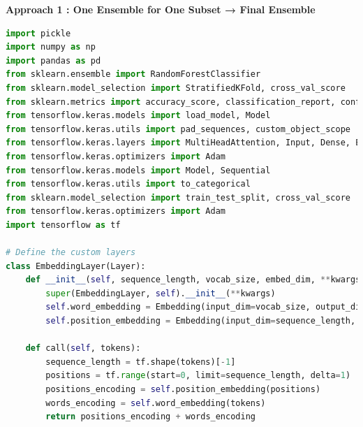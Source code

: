 \textbf{Approach 1 : One Ensemble for One Subset → Final Ensemble}

\begin{tcolorbox}[colback=gray!5!white, colframe=gray!80!black, boxrule=0.5pt, title=Hierarchical Ensemble Model 1] 
    \begin{lstlisting}[language=Python]
import pickle
import numpy as np
import pandas as pd
from sklearn.ensemble import RandomForestClassifier
from sklearn.model_selection import StratifiedKFold, cross_val_score
from sklearn.metrics import accuracy_score, classification_report, confusion_matrix
from tensorflow.keras.models import load_model, Model
from tensorflow.keras.utils import pad_sequences, custom_object_scope
from tensorflow.keras.layers import MultiHeadAttention, Input, Dense, Embedding, GlobalAveragePooling1D, LayerNormalization, Layer
from tensorflow.keras.optimizers import Adam
from tensorflow.keras.models import Model, Sequential
from tensorflow.keras.utils import to_categorical
from sklearn.model_selection import train_test_split, cross_val_score
from tensorflow.keras.optimizers import Adam
import tensorflow as tf

# Define the custom layers
class EmbeddingLayer(Layer):
    def __init__(self, sequence_length, vocab_size, embed_dim, **kwargs):
        super(EmbeddingLayer, self).__init__(**kwargs)
        self.word_embedding = Embedding(input_dim=vocab_size, output_dim=embed_dim)
        self.position_embedding = Embedding(input_dim=sequence_length, output_dim=embed_dim)

    def call(self, tokens):
        sequence_length = tf.shape(tokens)[-1]
        positions = tf.range(start=0, limit=sequence_length, delta=1)
        positions_encoding = self.position_embedding(positions)
        words_encoding = self.word_embedding(tokens)
        return positions_encoding + words_encoding
    \end{lstlisting}
\end{tcolorbox}

